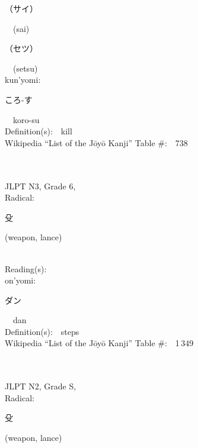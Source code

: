 \begin{multicols}{2}
{\hspace*{2em}}{\begin{CJK}{UTF8}{min} （サイ） \end{CJK}}\ \ (sai)\ \ \\
{\hspace*{2em}}{\begin{CJK}{UTF8}{min} （セツ） \end{CJK}}\ \ (setsu)\ \ \\
{\hspace*{1em}}kun'yomi:\ \ \\
{\hspace*{2em}}{\begin{CJK}{UTF8}{min} ころ-す \end{CJK}}\ \ koro-su\ \ \\
Definition(s):\ \ kill \\
Wikipedia ``List of the J\=oy\=o Kanji'' Table \#:\ \ 738 \\
\ \ \\
{\fontsize{34pt}{40pt}  }\ \ \\  %
{JLPT N3, Grade 6, \\Radical:\ \ {\begin{CJK}{UTF8}{min} 殳 \end{CJK}} (weapon, lance) } \\
Reading(s):\ \ \\
{\hspace*{1em}}on'yomi:\ \ \\
{\hspace*{2em}}{\begin{CJK}{UTF8}{min} ダン \end{CJK}}\ \ dan\ \ \\
Definition(s):\ \ steps \\
Wikipedia ``List of the J\=oy\=o Kanji'' Table \#:\ \ 1\,349 \\
\ \ \\
{\fontsize{34pt}{40pt}  }\ \ \\  %
{JLPT N2, Grade S, \\Radical:\ \ {\begin{CJK}{UTF8}{min} 殳 \end{CJK}} (weapon, lance) } \\

\end{multicols}
